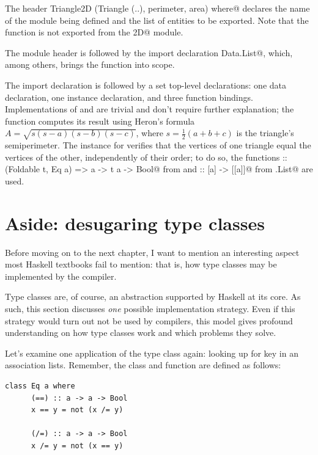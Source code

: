 \documentclass[UdineBachThesis,american,11pt,draft]{PhdThesis}
\begin{document}
  The header
  \lstinline@module Triangle2D (Triangle (..), perimeter, area) where@ declares
  the name of the module being defined and the list of entities to be exported.
  Note that the function \lstinline@segmentLength@ is not exported from the
  \lstinline@Triangle2D@ module.

  The module header is followed by the import declaration
  \lstinline@import Data.List@, which, among others, brings the function
  \lstinline@permutations@ into scope.

  The import declaration is followed by a set top-level declarations: one data
  declaration, one instance declaration, and three function bindings.
  Implementations of \lstinline@perimeter@ and \lstinline@segmentLength@ are
  trivial and don't require further explanation; the \lstinline@area@ function
  computes its result using Heron's formula
  $A = \sqrt{s \left(s - a\right) \left(s - b\right) \left(s - c\right)}$, where
  $s = \frac{1}{2} \left(a + b + c\right)$ is the triangle's semiperimeter. The
  \lstinline@Eq@ instance for \lstinline@Triangle@ verifies that the vertices of
  one triangle equal the vertices of the other, independently of their order;
  to do so, the functions
  \lstinline@elem :: (Foldable t, Eq a) => a -> t a -> Bool@ from
  \lstinline@Prelude@ and \lstinline@permutations :: [a] -> [[a]]@ from
  \lstinline@Data.List@ are used.

  \section{Aside: desugaring type classes}

  Before moving on to the next chapter, I want to mention an interesting aspect
  most Haskell textbooks fail to mention: that is, how type classes may be
  implemented by the compiler.

  Type classes are, of course, an abstraction supported by Haskell at its core.
  As such, this section discusses \emph{one} possible implementation strategy.
  Even if this strategy would turn out not be used by compilers, this model
  gives profound understanding on how type classes work and which problems they
  solve.

  Let's examine one application of the \lstinline@Eq@ type class again: looking
  up for key in an association lists. Remember, the \lstinline@Eq@ class and
  \lstinline@lookup@ function are defined as follows:

  \begin{lstlisting}[gobble=4,basicstyle=\ttfamily\small]
    class Eq a where
      (==) :: a -> a -> Bool
      x == y = not (x /= y)

      (/=) :: a -> a -> Bool
      x /= y = not (x == y)
  \end{lstlisting}
\end{document}
